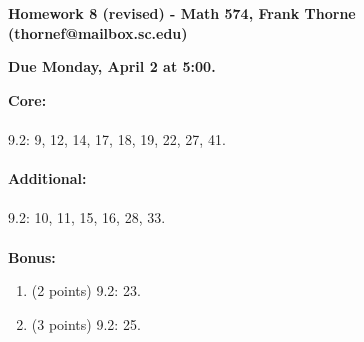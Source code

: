 \documentclass[12pt]{amsart}
\begin{document}
\setlength{\topmargin}{-2mm}





\begin{center}{\bf Homework 8 (revised) - Math 574, Frank Thorne (thornef@mailbox.sc.edu)}
\end{center}
\begin{center}
{\bf Due Monday, April 2 at 5:00.}
\end{center}
{\bf Core:}
\\
\\
9.2: 9, 12, 14, 17, 18, 19, 22, 27, 41.
\\
\\
{\bf Additional:}
\\
\\
9.2: 10, 11, 15, 16, 28, 33.
\\
\\
{\bf Bonus:}
\begin{enumerate}
\item (2 points)
9.2: 23.

\item (3 points)
9.2: 25.
\end{enumerate}
\end{document}
